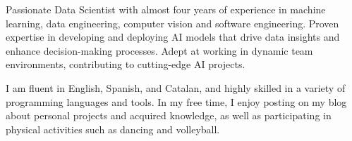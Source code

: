 

\begin{cvparagraph}


Passionate Data Scientist with almost four years of experience in machine
learning, data engineering, computer vision and software engineering. Proven
expertise in developing and deploying AI models that drive data insights
and enhance decision-making processes. Adept at working in dynamic team
environments, contributing to cutting-edge AI projects.

I am fluent in English, Spanish, and Catalan, and highly skilled in a variety
of programming languages and tools. In my free time, I enjoy posting on my blog
about personal projects and acquired knowledge, as well as participating in
physical activities such as dancing and volleyball.


\end{cvparagraph}
